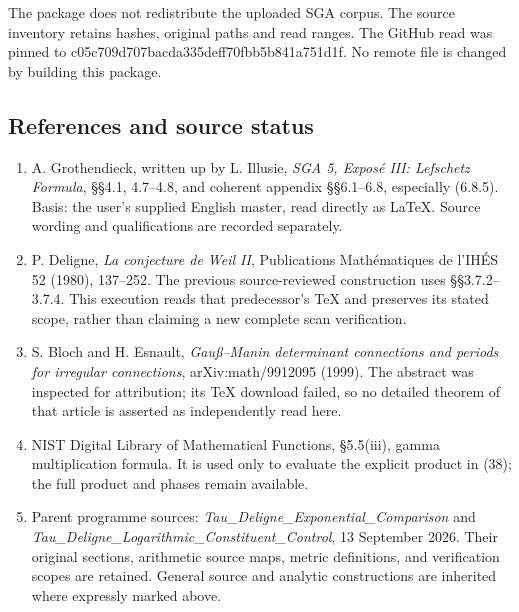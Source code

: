 The package does not redistribute the uploaded SGA corpus. The source inventory retains hashes, original paths and read ranges. The GitHub read was pinned to c05c709d707bacda335deff70fbb5b841a751d1f. No remote file is changed by building this package.

\subsection{References and source status}\label{endpoint-sga_trace_period--references-and-source-status}

\begin{enumerate}
\def\labelenumi{\arabic{enumi}.}
\tightlist
\item
  A. Grothendieck, written up by L. Illusie, \emph{SGA 5, Exposé III: Lefschetz Formula}, §§4.1, 4.7--4.8, and coherent appendix §§6.1--6.8, especially (6.8.5). Basis: the user's supplied English master, read directly as LaTeX. Source wording and qualifications are recorded separately.
\item
  P. Deligne, \emph{La conjecture de Weil II}, Publications Mathématiques de l'IHÉS 52 (1980), 137--252. The previous source-reviewed construction uses §§3.7.2--3.7.4. This execution reads that predecessor's TeX and preserves its stated scope, rather than claiming a new complete scan verification.
\item
  S. Bloch and H. Esnault, \emph{Gauß--Manin determinant connections and periods for irregular connections}, arXiv:math/9912095 (1999). The abstract was inspected for attribution; its TeX download failed, so no detailed theorem of that article is asserted as independently read here.
\item
  NIST Digital Library of Mathematical Functions, §5.5(iii), gamma multiplication formula. It is used only to evaluate the explicit product in (38); the full product and phases remain available.
\item
  Parent programme sources: \emph{Tau\_Deligne\_Exponential\_Comparison} and \emph{Tau\_Deligne\_Logarithmic\_Constituent\_Control}, 13 September 2026. Their original sections, arithmetic source maps, metric definitions, and verification scopes are retained. General source and analytic constructions are inherited where expressly marked above.
\end{enumerate}

